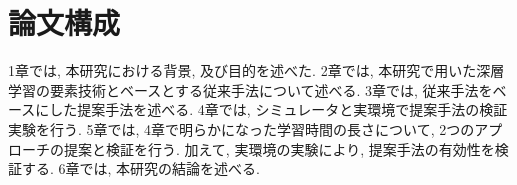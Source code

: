 
\section{論文構成}
1章では, 本研究における背景,  及び目的を述べた. 2章では, 本研究で用いた深層学習の要素技術とベースとする従来手法について述べる. 3章では, 従来手法をベースにした提案手法を述べる. 4章では, シミュレータと実環境で提案手法の検証実験を行う. 5章では, 4章で明らかになった学習時間の長さについて, 2つのアプローチの提案と検証を行う. 加えて, 実環境の実験により, 提案手法の有効性を検証する. 6章では, 本研究の結論を述べる.


\newpage
